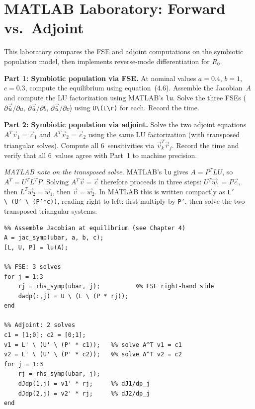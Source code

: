 \section{MATLAB Laboratory: Forward vs.\ Adjoint}
\label{sec:ch5matlab}

This laboratory compares the FSE and adjoint computations on the
symbiotic population model, then implements reverse-mode
differentiation for $R_0$.

\textbf{Part 1: Symbiotic population via FSE.}
At nominal values $a = 0.4$, $b = 1$, $c = 0.3$, compute
the equilibrium using equation~(4.6). Assemble the Jacobian~$A$
and compute the LU factorization using MATLAB's \texttt{lu}.
Solve the three FSEs ($\partial\vec{\bar{u}}/\partial a$,
$\partial\vec{\bar{u}}/\partial b$, $\partial\vec{\bar{u}}/\partial c$)
using \texttt{U\textbackslash(L\textbackslash r)} for each.
Record the time.

\textbf{Part 2: Symbiotic population via adjoint.}
Solve the two adjoint equations $A^T\vec{v}_1 = \vec{c}_1$ and
$A^T\vec{v}_2 = \vec{c}_2$ using the same LU factorization (with
transposed triangular solves). Compute all 6~sensitivities via
$\vec{v}_k^T\vec{r}_j$. Record the time and verify that all 6~values
agree with Part~1 to machine precision.

\medskip\noindent
\textit{MATLAB note on the transposed solve.}
MATLAB's \texttt{lu} gives $A = P^T L U$, so $A^T = U^T L^T P$.
Solving $A^T\vec{v} = \vec{c}$ therefore proceeds in three steps:
$U^T\vec{w}_1 = P\vec{c}$, then $L^T\vec{w}_2 = \vec{w}_1$, then $\vec{v} = \vec{w}_2$.
In MATLAB this is written compactly as \texttt{L' \textbackslash\ (U' \textbackslash\ (P'*c))},
reading right to left: first multiply by \texttt{P'}, then solve the two
transposed triangular systems.

\begin{verbatim}
%% Assemble Jacobian at equilibrium (see Chapter 4)
A = jac_symp(ubar, a, b, c);
[L, U, P] = lu(A);

%% FSE: 3 solves
for j = 1:3
    rj = rhs_symp(ubar, j);          %% FSE right-hand side
    dwdp(:,j) = U \ (L \ (P * rj));
end

%% Adjoint: 2 solves
c1 = [1;0]; c2 = [0;1];
v1 = L' \ (U' \ (P' * c1));   %% solve A^T v1 = c1
v2 = L' \ (U' \ (P' * c2));   %% solve A^T v2 = c2
for j = 1:3
    rj = rhs_symp(ubar, j);
    dJdp(1,j) = v1' * rj;     %% dJ1/dp_j
    dJdp(2,j) = v2' * rj;     %% dJ2/dp_j
end
\end{verbatim}


